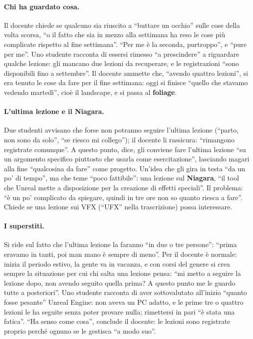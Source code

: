 \paragraph{Chi ha guardato cosa.} Il docente chiede se qualcuno sia riuscito a ``buttare un
occhio'' sulle cose della volta scorsa, ``o il fatto che sia in mezzo alla settimana ha reso
le cose più complicate rispetto al fine settimana''. ``Per me è la seconda, purtroppo'', e
``pure per me''. Uno studente racconta di essersi rimesso ``a prescindere'' a riguardare
qualche lezione: gli mancano due lezioni da recuperare, e le registrazioni ``sono
disponibili fino a settembre''. Il docente ammette che, ``avendo quattro lezioni'', si era
tenuto le cose da fare per il fine settimana: oggi si finisce ``quello che stavamo vedendo
martedì'', cioè il landscape, e si passa al \textbf{foliage}.

\paragraph{L'ultima lezione e il Niagara.} Due studenti avvisano che forse non potranno
seguire l'ultima lezione (``parto, non sono da solo'', ``se riesco mi collego''); il
docente li rassicura: ``rimangono registrate comunque''. A questo punto, dice, gli conviene
fare l'ultima lezione ``su un argomento specifico piuttosto che usarla come
esercitazione'', lasciando magari alla fine ``qualcosina da fare'' come progetto. Un'idea
che gli gira in testa ``da un po' di tempo'', ma che teme ``poco fattibile'': una lezione sul
\textbf{Niagara}, ``il tool che Unreal mette a disposizione per la creazione di effetti
speciali''. Il problema: ``è un po' complicato da spiegare, quindi in tre ore non so quanto
riesca a fare''. Chiede se una lezione sui VFX (``UFX'' nella trascrizione) possa
interessare.

\paragraph{I superstiti.} Si ride sul fatto che l'ultima lezione la faranno ``in due o tre
persone'': ``prima eravamo in tanti, poi man mano è sempre di meno''. Per il docente è
normale: inizia il periodo estivo, la gente va in vacanza, e con corsi del genere si crea
sempre la situazione per cui chi salta una lezione pensa: ``mi metto a seguire la lezione
dopo, non avendo seguito quella prima? A questo punto me le guardo tutte a posteriori''.
Uno studente racconta di aver sottovalutato all'inizio ``quanto fosse pesante'' Unreal
Engine: non aveva un PC adatto, e le prime tre o quattro lezioni le ha seguite senza poter
provare nulla; rimettersi in pari ``è stata una fatica''. ``Ha senso come cosa'', conclude
il docente: le lezioni sono registrate proprio perché ognuno se le gestisca ``a modo
suo''.

